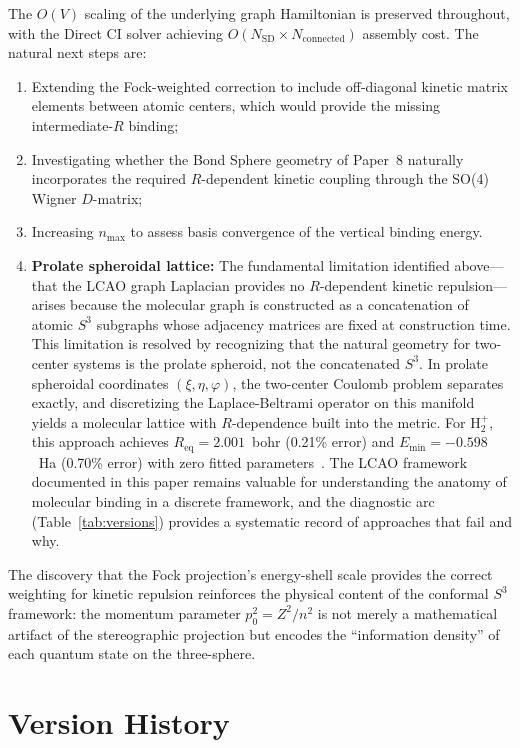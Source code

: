 \documentclass[aps,pra,twocolumn,superscriptaddress,longbibliography]{revtex4-2}
\begin{document}
The $O(V)$ scaling of the underlying graph Hamiltonian is preserved
throughout, with the Direct CI solver achieving
$O(N_{\mathrm{SD}}\times N_{\mathrm{connected}})$ assembly cost.
The natural next steps are:
\begin{enumerate}
\item Extending the Fock-weighted correction to include off-diagonal
kinetic matrix elements between atomic centers, which would provide
the missing intermediate-$R$ binding;
\item Investigating whether the Bond Sphere geometry of Paper~8
naturally incorporates the required $R$-dependent kinetic coupling
through the SO(4) Wigner $D$-matrix;
\item Increasing $n_{\max}$ to assess basis convergence of the
vertical binding energy.
\item \textbf{Prolate spheroidal lattice:} The fundamental limitation
identified above---that the LCAO graph Laplacian provides no
$R$-dependent kinetic repulsion---arises because the molecular graph
is constructed as a concatenation of atomic $S^3$ subgraphs whose
adjacency matrices are fixed at construction time.  This limitation
is resolved by recognizing that the natural geometry for two-center
systems is the prolate spheroid, not the concatenated $S^3$.  In
prolate spheroidal coordinates $(\xi, \eta, \varphi)$, the two-center
Coulomb problem separates exactly, and discretizing the
Laplace-Beltrami operator on this manifold yields a molecular lattice
with $R$-dependence built into the metric.  For H$_2^+$, this approach
achieves $R_{\mathrm{eq}} = 2.001$~bohr (0.21\% error) and
$E_{\min} = -0.598$~Ha (0.70\% error) with zero fitted
parameters~\cite{loutey_paper11}.  The LCAO framework documented in
this paper remains valuable for understanding the anatomy of molecular
binding in a discrete framework, and the diagnostic arc
(Table~\ref{tab:versions}) provides a systematic record of approaches
that fail and why.
\end{enumerate}
The discovery that the Fock projection's energy-shell scale provides
the correct weighting for kinetic repulsion reinforces the physical
content of the conformal $S^3$ framework: the momentum parameter
$p_0^2 = Z^2/n^2$ is not merely a mathematical artifact of the
stereographic projection but encodes the ``information density'' of
each quantum state on the three-sphere.

\appendix
\section{Version History}
\label{app:versions}
\end{document}
